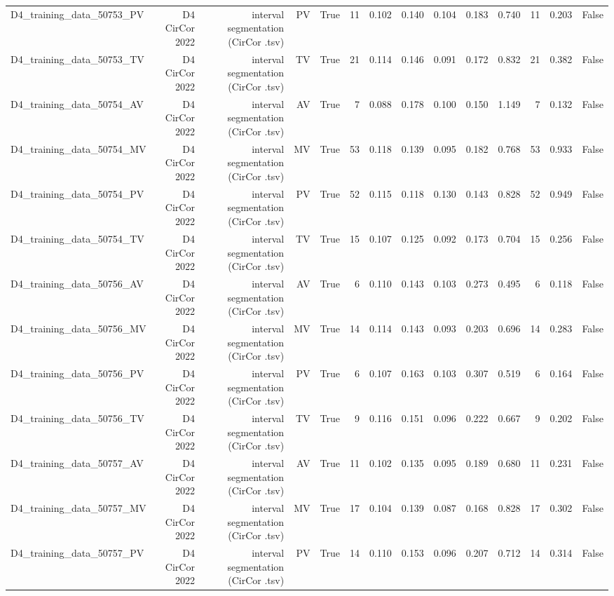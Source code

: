 \begin{table}[htbp]
\begin{tabular}{lrrrrrrrrrrrrr}
    D4\_training\_data\_50753\_PV & D4 CirCor 2022 & interval segmentation (CirCor .tsv) & PV & True & 11 & 0.102 & 0.140 & 0.104 & 0.183 & 0.740 & 11 & 0.203 & False \\
    D4\_training\_data\_50753\_TV & D4 CirCor 2022 & interval segmentation (CirCor .tsv) & TV & True & 21 & 0.114 & 0.146 & 0.091 & 0.172 & 0.832 & 21 & 0.382 & False \\
    D4\_training\_data\_50754\_AV & D4 CirCor 2022 & interval segmentation (CirCor .tsv) & AV & True & 7 & 0.088 & 0.178 & 0.100 & 0.150 & 1.149 & 7 & 0.132 & False \\
    D4\_training\_data\_50754\_MV & D4 CirCor 2022 & interval segmentation (CirCor .tsv) & MV & True & 53 & 0.118 & 0.139 & 0.095 & 0.182 & 0.768 & 53 & 0.933 & False \\
    D4\_training\_data\_50754\_PV & D4 CirCor 2022 & interval segmentation (CirCor .tsv) & PV & True & 52 & 0.115 & 0.118 & 0.130 & 0.143 & 0.828 & 52 & 0.949 & False \\
    D4\_training\_data\_50754\_TV & D4 CirCor 2022 & interval segmentation (CirCor .tsv) & TV & True & 15 & 0.107 & 0.125 & 0.092 & 0.173 & 0.704 & 15 & 0.256 & False \\
    D4\_training\_data\_50756\_AV & D4 CirCor 2022 & interval segmentation (CirCor .tsv) & AV & True & 6 & 0.110 & 0.143 & 0.103 & 0.273 & 0.495 & 6 & 0.118 & False \\
    D4\_training\_data\_50756\_MV & D4 CirCor 2022 & interval segmentation (CirCor .tsv) & MV & True & 14 & 0.114 & 0.143 & 0.093 & 0.203 & 0.696 & 14 & 0.283 & False \\
    D4\_training\_data\_50756\_PV & D4 CirCor 2022 & interval segmentation (CirCor .tsv) & PV & True & 6 & 0.107 & 0.163 & 0.103 & 0.307 & 0.519 & 6 & 0.164 & False \\
    D4\_training\_data\_50756\_TV & D4 CirCor 2022 & interval segmentation (CirCor .tsv) & TV & True & 9 & 0.116 & 0.151 & 0.096 & 0.222 & 0.667 & 9 & 0.202 & False \\
    D4\_training\_data\_50757\_AV & D4 CirCor 2022 & interval segmentation (CirCor .tsv) & AV & True & 11 & 0.102 & 0.135 & 0.095 & 0.189 & 0.680 & 11 & 0.231 & False \\
    D4\_training\_data\_50757\_MV & D4 CirCor 2022 & interval segmentation (CirCor .tsv) & MV & True & 17 & 0.104 & 0.139 & 0.087 & 0.168 & 0.828 & 17 & 0.302 & False \\
    D4\_training\_data\_50757\_PV & D4 CirCor 2022 & interval segmentation (CirCor .tsv) & PV & True & 14 & 0.110 & 0.153 & 0.096 & 0.207 & 0.712 & 14 & 0.314 & False \\

\end{tabular}
\end{table}
